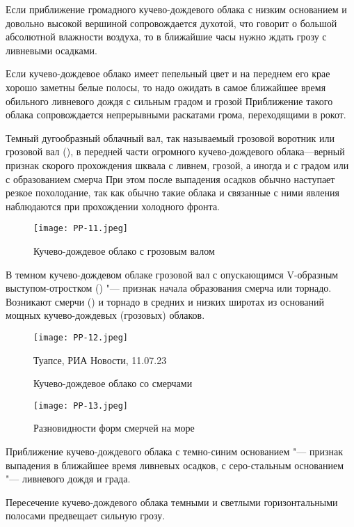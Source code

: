  Если приближение громадного кучево-дождевого облака с низким
основанием и довольно высокой вершиной сопровождается духотой, что
говорит о большой абсолютной влажности воздуха, то в ближайшие часы
нужно ждать грозу с ливневыми осадками.

 Если кучево-дождевое облако имеет пепельный цвет и на переднем
его крае хорошо заметны белые полосы, то надо ожидать в самое
ближайшее время обильного ливневого дождя с сильным градом и грозой
Приближение такого облака сопровождается непрерывными раскатами грома,
переходящими в рокот.

 Темный дугообразный облачный вал, так называемый грозовой
воротник или грозовой вал (), в передней части огромного
кучево-дождевого облака—верный признак скорого прохождения шквала с
ливнем, грозой, а иногда и с градом или с образованием смерча При этом
после выпадения осадков обычно наступает резкое похолодание, так как
обычно такие облака и связанные с ними явления наблюдаются при
прохождении холодного фронта.

\begin{figure}[htb]
  \centering{}
  \texttt{[image: PP-11.jpeg]}
  \caption{Кучево-дождевое облако с грозовым валом}
  \label{fig:pp11}
  \small
  \centering{}
\end{figure}

 В темном кучево-дождевом облаке грозовой вал с опускающимся
V-образным выступом-отростком () "--- признак начала образования
смерча или торнадо. Возникают смерчи () и торнадо в средних и
низких широтах из оснований мощных кучево-дождевых (грозовых) облаков.

\begin{figure}[htb]
  \centering{}
  \texttt{[image: PP-12.jpeg]}
  \caption{Кучево-дождевое облако со смерчами}
  \label{fig:pp12}
  \small
  \centering{}Туапсе, РИА Новости, 11.07.23
\end{figure}

\begin{figure}[htb]
  \centering{}
  \texttt{[image: PP-13.jpeg]}
  \caption{Разновидности форм смерчей на море}
  \label{fig:pp13}
  \small
  \centering{}
\end{figure}

 Приближение кучево-дождевого облака с темно-синим основанием "---
признак выпадения в ближайшее время ливневых осадков, с серо-стальным
основанием "--- ливневого дождя и града.

 Пересечение кучево-дождевого облака темными и светлыми
горизонтальными полосами предвещает сильную грозу.

